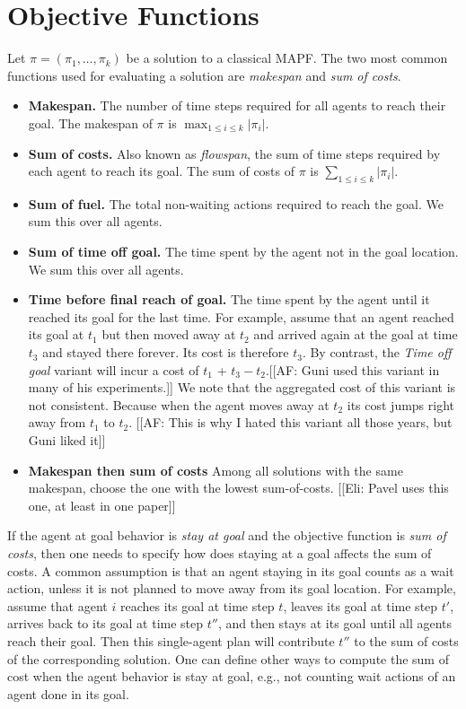 \section{Objective Functions}
Let $\pi=(\pi_1,\ldots,\pi_k)$ be a solution to a classical MAPF. 
The two most common functions used for evaluating a solution are \emph{makespan} and \emph{sum of costs}. 
\begin{itemize}
\item \textbf{Makespan.} The number of time steps required for all agents to reach their goal. The makespan of $\pi$ is $\max_{1\leq i\leq k} |\pi_i|$. 
\item \textbf{Sum of costs.} Also known as \emph{flowspan}, the sum of time steps required by each agent to reach its goal. The sum of costs of $\pi$ is $\sum_{1\leq i\leq k} |\pi_i|$. 
\item \textbf{Sum of fuel.} The total non-waiting actions required to reach the goal. We sum this over all agents.
\item \textbf{Sum of time off goal.} The time spent by the agent not in the goal location. We sum this over all agents.

\item \textbf{Time before final reach of goal.} The time spent by the agent until it reached its goal for the last time. For example, assume that an agent reached its goal at $t_1$ but then moved away at $t_2$ and arrived again at the goal at time $t_3$ and stayed there forever. Its cost is therefore $t_3$. By contrast, the {\em Time off goal} variant will incur a cost of $t_1$ + $t_3 - t_2$.[[AF: Guni used this variant in many of his experiments.]] We note that the aggregated cost of this variant is not consistent. Because when the agent moves away at $t_2$ its cost jumps right away from $t_1$ to $t_2$. [[AF: This is why I hated this variant all those years, but Guni liked it]]

\item \textbf{Makespan then sum of costs} Among all solutions with the same makespan, choose the one with the lowest sum-of-costs. [[Eli: Pavel uses this one, at least in one paper]]

\end{itemize}

If the agent at goal behavior is \emph{stay at goal} and the objective function is \emph{sum of costs}, then one needs to specify how does staying at a goal affects the sum of costs. A common assumption is that an agent staying in its goal counts as a wait action, unless it is not planned to move away from its goal location. For example, assume that agent $i$ reaches its goal at time step $t$, leaves its goal at time step $t'$, 
arrives back to its goal at time step $t''$, 
and then stays at its goal until all agents reach their goal. 
Then this single-agent plan will contribute $t''$ to the sum of costs of the corresponding solution. 
One can define other ways to compute the sum of cost when the agent behavior is stay at goal, e.g., not counting wait actions of an agent done in its goal. 

